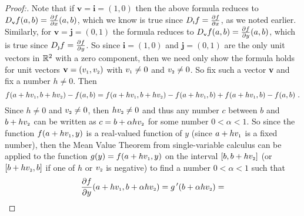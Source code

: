 \begin{proofbar}\vspace{-3mm}\begin{proof}[Proof:]
 Note that if $\textbf{v} = \textbf{i} = (1,0)$ then the above formula reduces to
 $D_{\scriptscriptstyle \textbf{v}}f(a,b) = \tfrac{\partial f}{\partial x}(a,b)$, which we know is true since
 $D_{\scriptscriptstyle \textbf{i}}f = \tfrac{\partial f}{\partial x}$, as we noted earlier. Similarly, for
 $\textbf{v} = \textbf{j} = (0,1)$ the formula reduces to $D_{\scriptscriptstyle \textbf{v}}f(a,b) =
 \tfrac{\partial f}{\partial y}(a,b)$, which is true since $D_{\scriptscriptstyle \textbf{j}}f = \tfrac{\partial f}{\partial y}$.
 So since $\textbf{i} = (1,0)$ and $\textbf{j} = (0,1)$ are the only unit vectors in $\mathbb{R}^{2}$ with a zero component,
 then we need only show the
 formula holds for unit vectors $\textbf{v} = (v_{\scriptscriptstyle 1},v_{\scriptscriptstyle 2})$ with $v_{\scriptscriptstyle 1} \ne 0$ and
 $v_{\scriptscriptstyle 2} \ne 0$. So fix such a vector \textbf{v} and fix a number $h \ne 0$.
\newpage
\noindent Then
 \begin{equation}\label{eqn:dirderivdiff}
  f(a+hv_{\scriptscriptstyle 1},b+hv_{\scriptscriptstyle 2}) - f(a,b) = f(a+hv_{\scriptscriptstyle 1},b+hv_{\scriptscriptstyle 2}) - f(a+hv_{\scriptscriptstyle 1},b) +
   f(a+hv_{\scriptscriptstyle 1},b) - f(a,b) ~.
 \end{equation}
 Since $h \ne 0$ and $v_{\scriptscriptstyle 2} \ne 0$, then $hv_{\scriptscriptstyle 2} \ne 0$ and thus any number $c$ between $b$ and
 $b+hv_{\scriptscriptstyle 2}$ can be written as $c=b+\alpha hv_{\scriptscriptstyle 2}$ for some number $0 < \alpha < 1$. So since the
 function $f(a+hv_{\scriptscriptstyle 1},y)$ is a real-valued function of $y$ (since $a+hv_{\scriptscriptstyle 1}$ is a fixed number), then
 the Mean Value Theorem from single-variable calculus can be applied to the function $g(y) = f(a+hv_{\scriptscriptstyle 1},y)$ on the
 interval $\lbrack b, b+hv_{\scriptscriptstyle 2} \rbrack$ (or $\lbrack b+hv_{\scriptscriptstyle 2}, b \rbrack$ if one of $h$ or $v_{\scriptscriptstyle 2}$ is
 negative) to find a number $0 < \alpha < 1$ such that
 \begin{displaymath}
  \frac{\partial f}{\partial y}(a+h\ssub{v}{1},b+\alpha h\ssub{v}{2}) = g\,'(b+\alpha h\ssub{v}{2}) = 

\end{displaymath}
\end{proof}
\end{proofbar}
